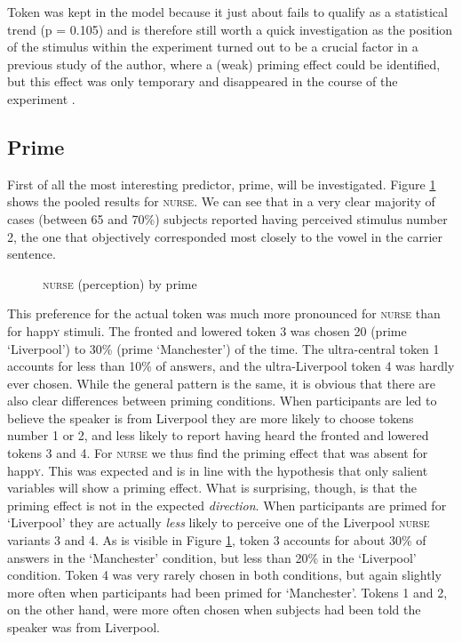Token was kept in the model because it just about fails to qualify as a statistical trend (p = 0.105) and is therefore still worth a quick investigation as the position of the stimulus within the experiment turned out to be a crucial factor in a previous study of the author, where a (weak) priming effect could be identified, but this effect was only temporary and disappeared in the course of the experiment \parencite[cf.][]{juskanma}.

\subsection{Prime}
\label{sec.perc_res.nurse.prime}

First of all the most interesting predictor, prime, will be investigated.
Figure \ref{fig.bar.nurse.tot.ext} shows the pooled results for \textsc{nurse}.
We can see that in a very clear majority of cases (between 65 and 70\%) subjects reported having perceived stimulus number 2, the one that objectively corresponded most closely to the vowel in the carrier sentence.

\begin{figure}[h]
	\centering
		\resizebox{.49\linewidth}{!}{} 
	\caption{\textsc{nurse} (perception) by prime}
	\label{fig.bar.nurse.tot.ext}
\end{figure}

This preference for the actual token was much more pronounced for \textsc{nurse} than for happ\textsc{y} stimuli.
The fronted and lowered token 3 was chosen 20 (prime `Liverpool') to 30\% (prime `Manchester') of the time.
The ultra-central token 1 accounts for less than 10\% of answers, and the ultra-Liverpool token 4 was hardly ever chosen.
While the general pattern is the same, it is obvious that there are also clear differences between priming conditions.
When participants are led to believe the speaker is from Liverpool they are more likely to choose tokens number 1 or 2, and less likely to report having heard the fronted and lowered tokens 3 and 4.
For \textsc{nurse} we thus find the priming effect that was absent for happ\textsc{y}.
This was expected and is in line with the hypothesis that only salient variables will show a priming effect.
What is surprising, though, is that the priming effect is not in the expected \emph{direction}.
When participants are primed for `Liverpool' they are actually \emph{less} likely to perceive one of the Liverpool \textsc{nurse} variants 3 and 4.
As is visible in Figure \ref{fig.bar.nurse.tot.ext}, token 3 accounts for about 30\% of answers in the `Manchester' condition, but less than 20\% in the `Liverpool' condition.
Token 4 was very rarely chosen in both conditions, but again slightly more often when participants had been primed for `Manchester'.
Tokens 1 and 2, on the other hand, were more often chosen when subjects had been told the speaker was from Liverpool.

